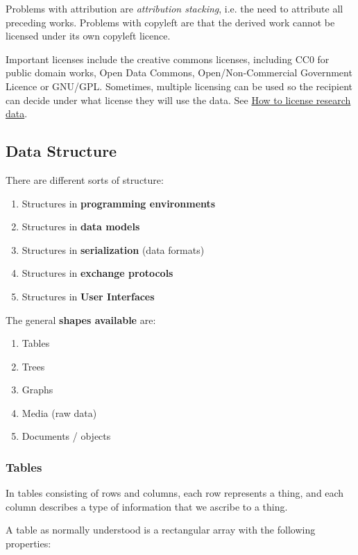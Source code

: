 Problems with attribution are \textit{attribution stacking}, i.e. the need to attribute all preceding works. Problems with copyleft are that the derived work cannot be licensed under its own copyleft licence.

Important licenses include the creative commons licenses, including CC0 for public domain works, Open Data Commons, Open/Non-Commercial Government Licence or GNU/GPL. Sometimes, multiple licensing can be used so the recipient can decide under what license they will use the data. See \href{https://www.dcc.ac.uk/guidance/how-guides/license-research-data#x1-8000}{How to license research data}.


\subsection{Data Structure}

There are different sorts of structure:

\begin{enumerate}
	\item Structures in \textbf{programming environments}
	\item Structures in \textbf{data models}
	\item Structures in \textbf{serialization} (data formats)
	\item Structures in \textbf{exchange protocols}
	\item Structures in \textbf{User Interfaces}
\end{enumerate}

The general \textbf{shapes available} are:

\begin{enumerate}
	\item Tables
	\item Trees
	\item Graphs
	\item Media (raw data)
	\item Documents / objects
\end{enumerate}

\subsubsection{Tables}

In tables consisting of rows and columns, each row represents a thing, and each column describes a type of information that we ascribe to a thing. 

A table as normally understood is a rectangular array with the following properties:

